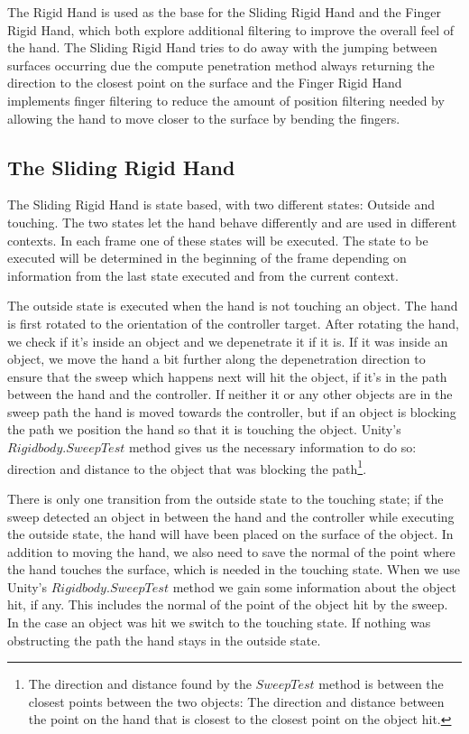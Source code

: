 The Rigid Hand is used as the base for the Sliding Rigid Hand and the Finger Rigid Hand, which both explore additional filtering to improve the overall feel of the hand. The Sliding Rigid Hand tries to do away with the jumping between surfaces occurring due the compute penetration method always returning the direction to the closest point on the surface and the Finger Rigid Hand implements finger filtering to reduce the amount of position filtering needed by allowing the hand to move closer to the surface by bending the fingers.

\subsection{The Sliding Rigid Hand}
\label{subsec:slidingRigidHand}
The Sliding Rigid Hand is state based, with two different states: Outside and touching. The two states let the hand behave differently and are used in different contexts. In each frame one of these states will be executed. The state to be executed will be determined in the beginning of the frame depending on information from the last state executed and from the current context.

The outside state is executed when the hand is not touching an object. The hand is first rotated to the orientation of the controller target. After rotating the hand, we check if it's inside an object and we depenetrate it if it is. If it was inside an object, we move the hand a bit further along the depenetration direction to ensure that the sweep which happens next will hit the object, if it's in the path between the hand and the controller. If neither it or any other objects are in the sweep path the hand is moved towards the controller, but if an object is blocking the path we position the hand so that it is touching the object. Unity's $Rigidbody.SweepTest$ method gives us the necessary information to do so: direction and distance to the object that was blocking the path\footnote{The direction and distance found by the $SweepTest$ method is between the closest points between the two objects: The direction and distance between the point on the hand that is closest to the closest point on the object hit.}.

There is only one transition from the outside state to the touching state; if the sweep detected an object in between the hand and the controller while executing the outside state, the hand will have been placed on the surface of the object. In addition to moving the hand, we also need to save the normal of the point where the hand touches the surface, which is needed in the touching state. When we use Unity's $Rigidbody.SweepTest$ method we gain some information about the object hit, if any. This includes the normal of the point of the object hit by the sweep. In the case an object was hit we switch to the touching state. If nothing was obstructing the path the hand stays in the outside state.

